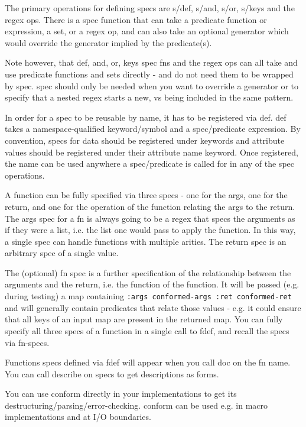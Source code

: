 The primary operations for defining specs are s/def, s/and, s/or, s/keys and the
regex ops. There is a spec function that can take a predicate function or
expression, a set, or a regex op, and can also take an optional generator which
would override the generator implied by the predicate(s).

Note however, that def, and, or, keys spec fns and the regex ops can all take
and use predicate functions and sets directly - and do not need them to be
wrapped by spec. spec should only be needed when you want to override a
generator or to specify that a nested regex starts a new, vs being included in
the same pattern.

In order for a spec to be reusable by name, it has to be registered via def. def
takes a namespace-qualified keyword/symbol and a spec/predicate expression. By
convention, specs for data should be registered under keywords and attribute
values should be registered under their attribute name keyword. Once registered,
the name can be used anywhere a spec/predicate is called for in any of the spec
operations.

A function can be fully specified via three specs - one for the args, one for
the return, and one for the operation of the function relating the args to the
return. The args spec for a fn is always going to be a regex that specs the
arguments as if they were a list, i.e. the list one would pass to apply the
function. In this way, a single spec can handle functions with multiple arities.
The return spec is an arbitrary spec of a single value.

The (optional) fn spec is a further specification of the relationship between
the arguments and the return, i.e. the function of the function. It will be
passed (e.g. during testing) a map containing\newline
\texttt{{:args conformed-args :ret conformed-ret}} and will
generally contain predicates that relate those values - e.g. it could ensure
that all keys of an input map are present in the returned map. You can fully
specify all three specs of a function in a single call to fdef, and recall the
specs via fn-specs.

Functions specs defined via fdef will appear when you call doc on the fn name.
You can call describe on specs to get descriptions as forms.

You can use conform directly in your implementations to get its
destructuring/parsing/error-checking. conform can be used e.g. in macro
implementations and at I/O boundaries.

